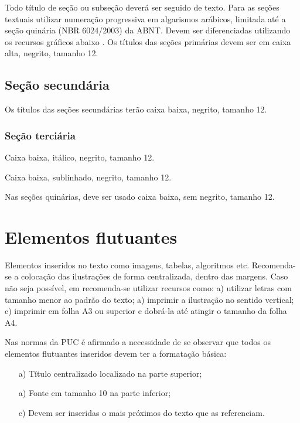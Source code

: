 Todo título de seção ou subseção deverá ser seguido de texto.
Para as seções textuais utilizar numeração progressiva em algarismos arábicos, limitada até a seção quinária 
(NBR 6024/2003) da ABNT. Devem ser diferenciadas utilizando os recursos gráficos abaixo \cite{manualpuc}.
Os títulos das seções primárias devem ser em caixa alta, negrito, tamanho 12.

\subsection{\esp Seção secundária}

Os títulos das seções secundárias terão caixa baixa, negrito, tamanho 12.

\subsubsection{\esp Seção terciária}

Caixa baixa, itálico, negrito, tamanho 12.

 
 Caixa baixa, sublinhado, negrito, tamanho 12.
 
 
 Nas seções quinárias, deve ser usado caixa baixa, sem negrito, tamanho 12.

\section{\esp Elementos flutuantes}

Elementos inseridos no texto como imagens, tabelas, algoritmos etc.
Recomenda-se a colocação das ilustrações de forma centralizada, dentro das margens. 
Caso não seja possível, em  recomenda-se utilizar recursos como: 
 a) utilizar letras com tamanho menor ao padrão do texto; a) imprimir a ilustração no sentido vertical; 
 c) imprimir em folha A3 ou superior e dobrá-la até atingir o tamanho da folha A4. 

Nas normas da PUC é afirmado a necessidade de se observar que todos os elementos flutuantes inseridos devem ter a formatação básica:

\begin{enumerate} 
 \item [a)] Título centralizado localizado na parte superior; 
 \item [a)] Fonte em tamanho 10 na parte inferior;
 \item [c)] Devem ser inseridas o mais próximos do texto que as referenciam.
\end{enumerate}


